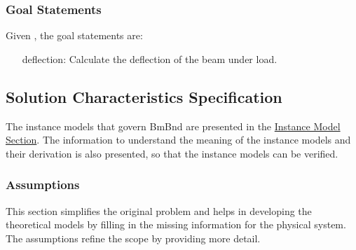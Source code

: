 \documentclass[12pt]{article}
\begin{document}
\subsubsection{Goal Statements}
\label{Sec:GoalStmt}
Given , the goal statements are:

\begin{itemize}
\item[deflection:\phantomsection\label{deflection}]{Calculate the deflection of the beam under load.}
\end{itemize}
\subsection{Solution Characteristics Specification}
\label{Sec:SolCharSpec}
The instance models that govern BmBnd are presented in the \hyperref[Sec:IMs]{Instance Model Section}. The information to understand the meaning of the instance models and their derivation is also presented, so that the instance models can be verified.

\subsubsection{Assumptions}
\label{Sec:Assumps}
This section simplifies the original problem and helps in developing the theoretical models by filling in the missing information for the physical system. The assumptions refine the scope by providing more detail.
\end{document}
